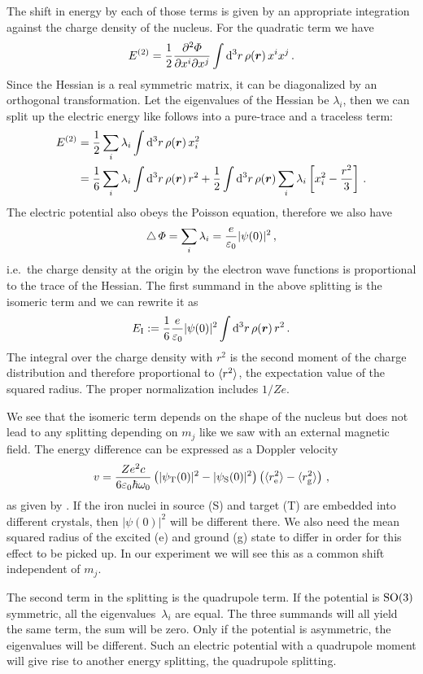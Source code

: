 \documentclass[11pt, english, fleqn, DIV=15, headinclude, BCOR=2cm]{scrreprt}
\begin{document}
The shift in energy by each of those terms is given by an appropriate
integration against the charge density of the nucleus. For the quadratic term
we have
\[
    E^{(2)} = \frac 12 \frac{\partial^2 \Phi}{\partial x^i \partial x^j}
    \int \dif^3 r \, \rho(\vec r) \, x^i x^j \,.
\]
Since the Hessian is a real symmetric matrix, it can be diagonalized by an
orthogonal transformation. Let the eigenvalues of the Hessian be $\lambda_i$,
then we can split up the electric energy like follows into a pure-trace and a
traceless term:
\begin{align*}
    E^{(2)}
    &= \frac12 \sum_i \lambda_i \int \dif^3 r \, \rho(\vec r) \, x_i^2 \\
    &= \frac16 \sum_i \lambda_i \int \dif^3 r \, \rho(\vec r) \, r^2
    + \frac12 \int \dif^3 r \, \rho(\vec r) \sum_i \lambda_i \sbr{x_i^2 -
    \frac{r^2}3} \,.
\end{align*}
The electric potential also obeys the Poisson equation, therefore we also have
\[
    \operatorname{\bigtriangleup} \Phi = \sum_i \lambda_i = \frac{e}{\varepsilon_0} |\psi(0)|^2 \,,
\]
i.e.\ the charge density at the origin by the electron wave functions is
proportional to the trace of the Hessian. The first summand in the above
splitting is the isomeric term and we can rewrite it as
\[
    E_\text I := \frac16 \frac{e}{\varepsilon_0} |\psi(0)|^2
    \int \dif^3 r \, \rho(\vec r) \, r^2 \,.
\]
The integral over the charge density with $r^2$ is the second moment of the
charge distribution and therefore proportional to $\langle r^2 \rangle$, the
expectation value of the squared radius. The proper normalization includes
$1/Ze$.

We see that the isomeric term depends on the shape of the nucleus but does not
lead to any splitting depending on $m_j$ like we saw with an external magnetic
field.
The energy difference can be expressed as a Doppler velocity
\[
    v = \frac{Z e^2 c}{6 \varepsilon_0 \hbar \omega_0}
    \left( |\psi_\text T(0)|^2 - |\psi_\text S(0)|^2 \right)
    \left( \langle r^2_\text{e} \rangle - \langle r^2_\text{g} \rangle \right) \,,
\]
as given by \textcite[(4.31)]{Schatz/Nukleare_Festkoerperphysik}. If the iron
nuclei in source (S) and target (T) are embedded into different crystals, then
$|\psi(0)|^2$ will be different there. We also need the mean squared radius of
the excited (e) and ground (g) state to differ in order for this effect to be
picked up. In our experiment we will see this as a common shift independent of
$m_j$.

The second term in the splitting is the quadrupole term. If the potential is
$\mathrm{SO}(3)$ symmetric, all the eigenvalues~$\lambda_i$ are equal. The three
summands will all yield the same term, the sum will be zero. Only if the
potential is asymmetric, the eigenvalues will be different. Such an electric
potential with a quadrupole moment will give rise to another energy splitting,
the quadrupole splitting.
\end{document}

